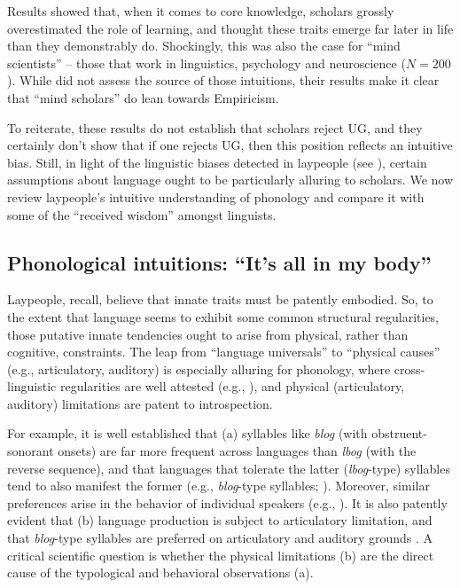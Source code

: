 \documentclass[output=paper,colorlinks,citecolor=brown
]{langscibook}
\begin{document}
Results showed that, when it comes to core knowledge, scholars grossly overestimated the role of learning, and thought these traits emerge far later in life than they demonstrably do. Shockingly, this was also the case for “mind scientists” -- those that work in linguistics, psychology and neuroscience ($N=200$). While \citet{wang2019empiricism} did not assess the source of those intuitions, their results make it clear that “mind scholars” do lean towards Empiricism.

To reiterate, these results do not establish that scholars reject UG, and they certainly don’t show that if one rejects UG, then this position reflects an intuitive bias. Still, in light of the linguistic biases detected in laypeople (see ), certain assumptions about language ought to be particularly alluring to scholars. We now review laypeople’s intuitive understanding of phonology and compare it with some of the “received wisdom” amongst linguists. 

\subsection{Phonological intuitions: “It’s all in my body”}

Laypeople, recall, believe that innate traits must be patently embodied. So, to the extent that language seems to exhibit some common structural regularities, those putative innate tendencies ought to arise from physical, rather than cognitive, constraints. The leap from “language universals” to “physical causes” (e.g., articulatory, auditory) is especially alluring for phonology, where cross-linguistic regularities are well attested (e.g., \cite{greenberg1966universals}), and physical (articulatory, auditory) limitations are patent to introspection. 

For example, it is well established that (a) syllables like \textit{blog} (with obstruent-sonorant onsets) are far more frequent across languages than \textit{lbog} (with the reverse sequence), and that languages that tolerate the latter (\textit{lbog}-type) syllables tend to also manifest the former (e.g., \textit{blog}-type syllables; \cite{greenberg1978some}). Moreover, similar preferences arise in the behavior of individual speakers (e.g., \cite{berent2013phonologicalb}). It is also patently evident that (b) language production is subject to articulatory limitation, and that \textit{blog}-type syllables are preferred on articulatory and auditory grounds \citep{mattingly1981phonetic,wright2004review}. A critical scientific question is whether the physical limitations (b) are the direct cause of the typological and behavioral observations (a). 
\end{document}
